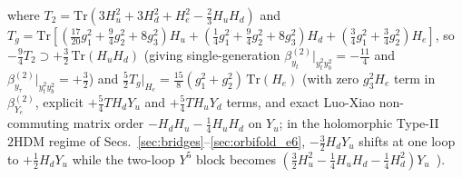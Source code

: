 \documentclass[aps,prd,twocolumn,nofootinbib,floatfix]{revtex4-2}
\begin{document}
where $T_2 = \mathrm{Tr}(3H_u^2 + 3H_d^2 + H_e^2 - \frac{2}{3}H_u H_d)$ and $T_g = \mathrm{Tr}[(\frac{17}{20}g_1^2 + \frac{9}{4}g_2^2 + 8g_3^2)H_u + (\frac{1}{4}g_1^2 + \frac{9}{4}g_2^2 + 8g_3^2)H_d + (\frac{3}{4}g_1^2 + \frac{3}{4}g_2^2)H_e]$, so $-\frac{9}{4}T_2 \supset +\frac{3}{2}\,\mathrm{Tr}(H_u H_d)$ (giving single-generation $\beta_{y_t}^{(2)}|_{y_t^2 y_b^2} = -\frac{11}{4}$ and $\beta_{y_\tau}^{(2)}|_{y_t^2 y_b^2} = +\frac{3}{2}$) and $\frac{5}{2}T_g|_{H_e} = \frac{15}{8}(g_1^2 + g_2^2)\,\mathrm{Tr}(H_e)$ (with zero $g_3^2 H_e$ term in $\beta_{Y_e}^{(2)}$, explicit $+\frac{5}{4}T H_d Y_u$ and $+\frac{5}{4}T H_u Y_d$ terms, and exact Luo-Xiao non-commuting matrix order $-H_d H_u - \frac{1}{4}H_u H_d$ on $Y_u$; in the holomorphic Type-II $2\mathrm{HDM}$ regime of Secs.~\ref{sec:bridges}--\ref{sec:orbifold_e6}, $-\frac{3}{2}H_d Y_u$ shifts at one loop to $+\frac{1}{2}H_d Y_u$ while the two-loop $Y^5$ block becomes $(\frac{3}{2}H_u^2 - \frac{1}{4}H_u H_d - \frac{1}{4}H_d^2)Y_u$~\cite{MachacekVaughn1984}).
\end{document}
